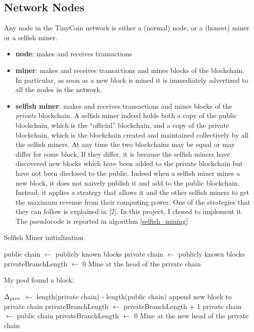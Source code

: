 \documentclass{article}
\begin{document}
\subsection{Network Nodes} Any node in the TinyCoin network is either a (normal) node, or a (honest) miner or a selfish miner.
\begin{itemize}
\item \textbf{node}: makes and receives transactions
\item \textbf{miner}: makes and receives transactions and mines blocks of the blockchain. In particular, as soon as a new block is mined it is immediately advertized to all the nodes in the network.
\item \textbf{selfish miner}: makes and receives transactions and mines blocks of the \textit{private} blockchain. A selfish miner indeed holds both a copy of the public blockchain, which is the ``official'' blockchain, and a copy of the private blockchain, which is the blockchain created and maintained collectively by all the selfish miners. At any time the two blockchains may be equal or may differ for some block. If they differ, it is because the selfish miners have discovered new blocks which have been added to the private blockchain but have not been disclosed to the public. Indeed when a selfish miner mines a new block, it does not naively publish it and add to the public blockchain. Instead, it applies a strategy that allows it and the other selfish miners to get the maximum revenue from their computing power. One of the strategies that they can follow is explained in [2]. In this project, I chosed to implement it. The pseudocode is reported in algorithm \ref{selfish_mining}
\end{itemize}

\begin{algorithm}
\caption{Selfish Miner initialization}\label{selfish_mining}
\begin{algorithmic}[1]
\State public chain $\gets$ publicly known blocks
\State private chain $\gets$ publicly known blocks
\State privateBranchLength $\gets$ 0
\State Mine at the head of the private chain 
\end{algorithmic}
\end{algorithm}

\begin{algorithm}
\caption{My pool found a block:}\label{selfish_mining}
\begin{algorithmic}[1]
\State $\Delta\textsubscript{prev}$ $\gets$ length(private chain) - length(public chain)
\State append new block to private chain
\State privateBranchLength $\gets$ privateBranchLength + 1
\State private chain $\gets$ public chain
\State privateBranchLength $\gets$ 0
\EndIf 
\State Mine at the new head of the private chain 
\end{algorithmic}
\end{algorithm}
\end{document}
